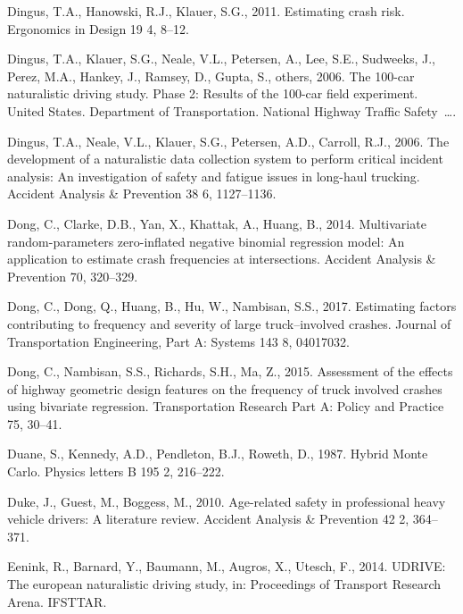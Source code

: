 \documentclass[12pt]{book}
\numberwithin{equation}{chapter}
\begin{document}
\leavevmode\hypertarget{ref-dingus2011estimating}{}%
Dingus, T.A., Hanowski, R.J., Klauer, S.G., 2011. Estimating crash risk. Ergonomics in Design 19 4, 8--12.

\leavevmode\hypertarget{ref-dingus2006100}{}%
Dingus, T.A., Klauer, S.G., Neale, V.L., Petersen, A., Lee, S.E., Sudweeks, J., Perez, M.A., Hankey, J., Ramsey, D., Gupta, S., others, 2006. The 100-car naturalistic driving study. Phase 2: Results of the 100-car field experiment. United States. Department of Transportation. National Highway Traffic Safety~\ldots{}.

\leavevmode\hypertarget{ref-dingus2006development}{}%
Dingus, T.A., Neale, V.L., Klauer, S.G., Petersen, A.D., Carroll, R.J., 2006. The development of a naturalistic data collection system to perform critical incident analysis: An investigation of safety and fatigue issues in long-haul trucking. Accident Analysis \& Prevention 38 6, 1127--1136.

\leavevmode\hypertarget{ref-dong2014multivariate}{}%
Dong, C., Clarke, D.B., Yan, X., Khattak, A., Huang, B., 2014. Multivariate random-parameters zero-inflated negative binomial regression model: An application to estimate crash frequencies at intersections. Accident Analysis \& Prevention 70, 320--329.

\leavevmode\hypertarget{ref-dong2017estimating}{}%
Dong, C., Dong, Q., Huang, B., Hu, W., Nambisan, S.S., 2017. Estimating factors contributing to frequency and severity of large truck--involved crashes. Journal of Transportation Engineering, Part A: Systems 143 8, 04017032.

\leavevmode\hypertarget{ref-dong2015assessment}{}%
Dong, C., Nambisan, S.S., Richards, S.H., Ma, Z., 2015. Assessment of the effects of highway geometric design features on the frequency of truck involved crashes using bivariate regression. Transportation Research Part A: Policy and Practice 75, 30--41.

\leavevmode\hypertarget{ref-duane1987hybrid}{}%
Duane, S., Kennedy, A.D., Pendleton, B.J., Roweth, D., 1987. Hybrid Monte Carlo. Physics letters B 195 2, 216--222.

\leavevmode\hypertarget{ref-duke2010age}{}%
Duke, J., Guest, M., Boggess, M., 2010. Age-related safety in professional heavy vehicle drivers: A literature review. Accident Analysis \& Prevention 42 2, 364--371.

\leavevmode\hypertarget{ref-eenink2014udrive}{}%
Eenink, R., Barnard, Y., Baumann, M., Augros, X., Utesch, F., 2014. UDRIVE: The european naturalistic driving study, in: Proceedings of Transport Research Arena. IFSTTAR.
\end{document}
